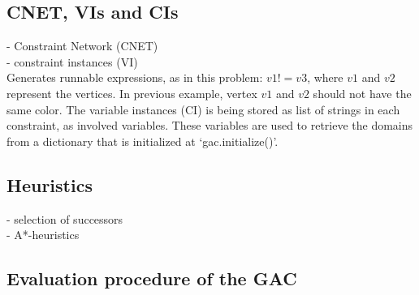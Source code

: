 

\subsection{CNET, VIs and CIs}
- Constraint Network (CNET)\\
- constraint instances (VI)\\
Generates runnable expressions, as in this problem: \( v1 != v3 \), where \(v1\) and \(v2\) represent the vertices. In previous example, vertex \(v1\) and \(v2\) should not have the same color. The variable instances (CI) is being stored as list of strings in each constraint, as involved variables. These variables are used to retrieve the domains from a dictionary that is initialized at `gac.initialize()'.



\subsection*{Heuristics}
- selection of successors\\
- A*-heuristics

\subsection{Evaluation procedure of the GAC}
